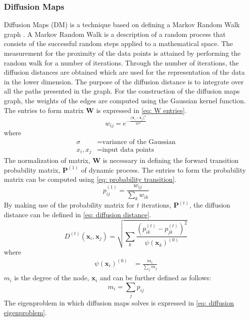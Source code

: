 \documentclass[11pt]{article}
\begin{document}
	\subsubsection{Diffusion Maps}
	Diffusion Maps (DM) is a technique based on defining a Markov Random Walk graph \cite{COIFMAN20065}. A Markov Random Walk is a description of a random process that consists of the successful random steps applied to a mathematical space. The measurement for the proximity of the data points is attained by performing the random walk for a number of iterations. Through the number of iterations, the diffusion distances are obtained which are used for the representation of the data in the lower dimension. The purpose of the diffusion distance is to integrate over all the paths presented in the graph. For the construction of the diffusion maps graph, the weights of the edges are computed using the Gaussian kernel function. The entries to form matrix \textbf{W} is expressed in \eqref{eq: W entries}.
	\begin{equation}
		w_{ij} = e^{-\frac{||\textbf{x}_i - \textbf{x}_j||^2}{2\sigma^2}}
		\label{eq: W entries}
	\end{equation}
	where
	\begin{align*}
		\sigma &= \text{variance of the Gaussian}\\
		x_i, x_j &= \text{input data points}
	\end{align*}
	The normalization of matrix, \textbf{W} is necessary in defining the forward transition probability matrix, $\textbf{P}^{(1)}$ of dynamic process. The entries to form the probability matrix can be computed using \eqref{eq: probability transition}.
	\begin{equation}
		p_{ij}^{(1)} = \frac{w_{ij}}{\sum_{k}w_{ik}}
		\label{eq: probability transition}
	\end{equation}
	By making use of the probability matrix for $t$ iterations, $\textbf{P}^{(t)}$, the diffusion distance can be defined in \eqref{eq: diffusion distance}.
	\begin{equation}
		D^{(t)}(\textbf{x}_i, \textbf{x}_j) = \sqrt{\sum_{k}\frac{(p_{ik}^{(t)}-p_{jk}^{(t)})^2}{\psi(\textbf{x}_k)^{(0)}}}
		\label{eq: diffusion distance}
	\end{equation}
	where
	\begin{align*}
		\psi(\textbf{x}_i)^{(0)} &= \frac{m_i}{\sum_{j}m_j}
	\end{align*}
	$m_i$ is the degree of the node, $\textbf{x}_i$ and can be further defined as follows:
	\[m_i = \sum_{j}p_{ij}\]
	The eigenproblem in which diffusion maps solves is expressed in \eqref{eq: diffusion eigenproblem}. 
\end{document}
